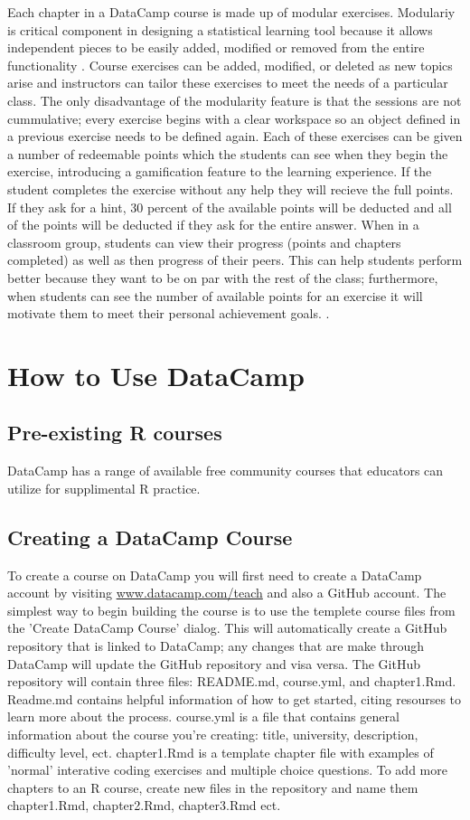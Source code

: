 \documentclass{tise_style}
\begin{document}
Each chapter in a DataCamp course is made up of modular exercises. Modulariy is critical component in designing a statistical
learning tool because it allows independent pieces to be easily added, modified or removed from the entire functionality
\citep{Hare2017}. Course exercises can be added, modified, or deleted as new topics arise and instructors can tailor
these exercises to meet the needs of a particular class. The only disadvantage of the modularity feature is that the sessions
are not cummulative; every exercise begins with a clear workspace so an object defined in a previous exercise needs to be
defined again. Each of these exercises can be given a number of redeemable points which the students can see when they begin
the exercise, introducing a gamification feature to the learning experience. If the student completes the exercise without
any help they will recieve the full points. If they ask for a hint, 30 percent of the available points will be deducted and
all of the points will be deducted if they ask for the entire answer. When in a classroom group, students can view their
progress (points and chapters completed) as well as then progress of their peers. This can help students perform better
because they want to be on par with the rest of the class; furthermore, when students can see the number of available points
for an exercise it will motivate them to meet their personal achievement goals. \citep{Chang2016}.


\section{How to Use DataCamp}

\subsection{Pre-existing R courses}
DataCamp has a range of available free community courses that educators can utilize for supplimental R practice.

\subsection{Creating a DataCamp Course}
To create a course on DataCamp you will first need to create a DataCamp account by visiting \url{www.datacamp.com/teach} and
also a GitHub account. The simplest way to begin building the course is to use the templete course files from the 'Create
DataCamp Course' dialog. This will automatically create a GitHub repository that is linked to DataCamp; any changes that are
make through DataCamp will update the GitHub repository and visa versa. The GitHub repository will contain three files:
README.md, course.yml, and chapter1.Rmd.
Readme.md contains helpful information of how to get started, citing resourses to learn more about the process.
course.yml is a file that contains general information about the course you're creating: title, university, description,
difficulty level, ect.
chapter1.Rmd is a template chapter file with examples of 'normal' interative coding exercises and multiple choice questions.
To add more chapters to an R course, create new files in the repository and name them chapter1.Rmd, chapter2.Rmd, chapter3.Rmd
ect.
\end{document}
